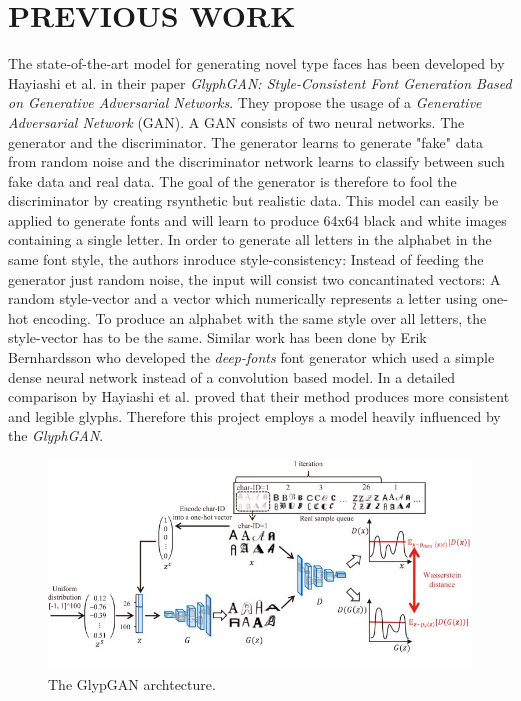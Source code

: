 \documentclass[11pt]{article}
\begin{document}
\section{PREVIOUS WORK}
The state-of-the-art model for generating novel type faces has been developed by Hayiashi et al. in their paper \emph{GlyphGAN: Style-Consistent Font Generation Based on Generative Adversarial Networks}. They propose the usage of a \emph{Generative Adversarial Network} (GAN). A GAN consists of two neural networks. The generator and the discriminator. The generator learns to generate "fake" data from random noise and the discriminator network learns to classify between such fake data and real data. The goal of the generator is therefore to fool the discriminator by creating rsynthetic but realistic data. This model can easily be applied to generate fonts and will learn to produce 64x64 black and white images containing a single letter. In order to generate all letters in the alphabet in the same font style, the authors inroduce style-consistency: Instead of feeding the generator just random noise, the input will consist two concantinated vectors: A random style-vector and a vector which numerically represents a letter using one-hot encoding. To produce an alphabet with the same style over all letters, the style-vector has to be the same.
Similar work has been done by Erik Bernhardsson who developed the \emph{deep-fonts} font generator which used a simple dense neural network instead of a convolution based model.
In a detailed comparison by Hayiashi et al. proved that their method produces more consistent and legible glyphs. Therefore this project employs a model heavily influenced by the \emph{GlyphGAN}.


\begin{figure}
    \includegraphics[width=\linewidth]{glyphgan.png}
    \caption{The GlypGAN archtecture.}
    \label{fig:glyphgan}
\end{figure}
\end{document}
